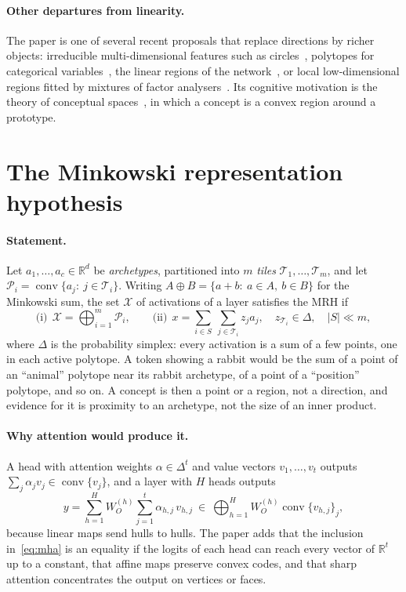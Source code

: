 \documentclass[sigconf,nonacm,screen]{acmart}
\newcommand{\R}{\mathbb{R}}
\newcommand{\conv}{\operatorname{conv}}
\newcommand{\msum}{\oplus}
\newcommand{\bigmsum}{\bigoplus}
\newcommand{\simplex}{\Delta}
\newcommand{\X}{\mathcal{X}}
\newcommand{\cP}{\mathcal{P}}
\newcommand{\cT}{\mathcal{T}}
\begin{document}
\paragraph{Other departures from linearity.} The paper is one of several recent proposals that replace
directions by richer objects: irreducible multi-dimensional features such as circles~\cite{engels2025not},
polytopes for categorical variables~\cite{park2025geometry}, the linear regions of the
network~\cite{black2022polytope}, or local low-dimensional regions fitted by mixtures of factor
analysers~\cite{shafran2026directions}. Its cognitive motivation is the theory of conceptual
spaces~\cite{gardenfors2000conceptual}, in which a concept is a convex region around a prototype.

\section{The Minkowski representation hypothesis}
\label{sec:mrh}

\paragraph{Statement.} Let $a_1,\dots,a_c\in\R^d$ be \emph{archetypes}, partitioned into $m$ \emph{tiles}
$\cT_1,\dots,\cT_m$, and let $\cP_i=\conv\{a_j:\ j\in\cT_i\}$. Writing $A\msum B=\{a+b:\ a\in A,\ b\in B\}$
for the Minkowski sum, the set $\X$ of activations of a layer satisfies the MRH if
\begin{equation}
  \text{(i)}\ \ \X=\bigmsum_{i=1}^{m}\cP_i ,\qquad
  \text{(ii)}\ \ x=\sum_{i\in S}\ \sum_{j\in\cT_i} z_j a_j,\quad z_{\cT_i}\in\simplex,\quad |S|\ll m,
  \label{eq:mrh}
\end{equation}
where $\simplex$ is the probability simplex: every activation is a sum of a few points, one in each active
polytope. A token showing a rabbit would be the sum of a point of an ``animal'' polytope near its rabbit
archetype, of a point of a ``position'' polytope, and so on. A concept is then a point or a region, not a
direction, and evidence for it is proximity to an archetype, not the size of an inner product.

\paragraph{Why attention would produce it.} A head with attention weights $\alpha\in\simplex^{t}$ and
value vectors $v_1,\dots,v_t$ outputs $\sum_j\alpha_j v_j\in\conv\{v_j\}$, and a layer with $H$ heads
outputs
\begin{equation}
  y=\sum_{h=1}^{H}W_O^{(h)}\sum_{j=1}^{t}\alpha_{h,j}\,v_{h,j}\ \in\ \bigmsum_{h=1}^{H}W_O^{(h)}\conv\{v_{h,j}\}_j ,
  \label{eq:mha}
\end{equation}
because linear maps send hulls to hulls. The paper adds that the inclusion in~\eqref{eq:mha} is an equality
if the logits of each head can reach every vector of $\R^t$ up to a constant, that affine maps preserve
convex codes, and that sharp attention concentrates the output on vertices or faces.
\end{document}
